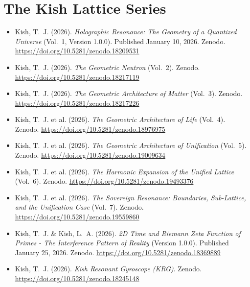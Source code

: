 \documentclass[11pt, letterpaper, openany]{book}
\begin{document}
\section*{The Kish Lattice Series}
\begin{itemize}
    \item Kish, T.~J. (2026). \textit{Holographic Resonance: The Geometry of a Quantized Universe} (Vol.~1, Version 1.0.0). Published January 10, 2026. Zenodo. \url{https://doi.org/10.5281/zenodo.18209531} \label{kish2026vol1}
    \item Kish, T.~J. (2026). \textit{The Geometric Neutron} (Vol.~2). Zenodo. \url{https://doi.org/10.5281/zenodo.18217119}
    \item Kish, T.~J. (2026). \textit{The Geometric Architecture of Matter} (Vol.~3). Zenodo. \url{https://doi.org/10.5281/zenodo.18217226}
    \item Kish, T.~J. et al. (2026). \textit{The Geometric Architecture of Life} (Vol.~4). Zenodo. \url{https://doi.org/10.5281/zenodo.18976975}
    \item Kish, T.~J. et al. (2026). \textit{The Geometric Architecture of Unification} (Vol.~5). Zenodo. \url{https://doi.org/10.5281/zenodo.19009634}
    \item Kish, T.~J. et al. (2026). \textit{The Harmonic Expansion of the Unified Lattice} (Vol.~6). Zenodo. \url{https://doi.org/10.5281/zenodo.19493376}
    \item Kish, T.~J. et al. (2026). \textit{The Sovereign Resonance: Boundaries, Sub-Lattice, and the Unification Case} (Vol.~7). Zenodo. \url{https://doi.org/10.5281/zenodo.19559860}
    \item Kish, T.~J. \& Kish, L.~A. (2026). \textit{2D Time and Riemann Zeta Function of Primes - The Interference Pattern of Reality} (Version 1.0.0). Published January 25, 2026. Zenodo. \url{https://doi.org/10.5281/zenodo.18369889}
    \item Kish, T.~J. (2026). \textit{Kish Resonant Gyroscope (KRG)}. Zenodo. \url{https://doi.org/10.5281/zenodo.18245148}
\end{itemize}
\end{document}
